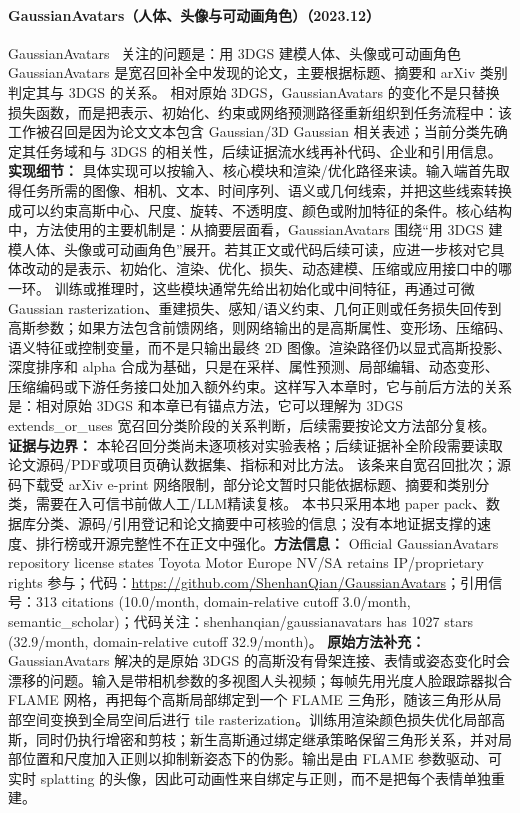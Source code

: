 \paragraph{GaussianAvatars（人体、头像与可动画角色）（2023.12）}
GaussianAvatars~\cite{2312_02069} 关注的问题是：用 3DGS 建模人体、头像或可动画角色 GaussianAvatars 是宽召回补全中发现的论文，主要根据标题、摘要和 arXiv 类别判定其与 3DGS 的关系。
相对原始 3DGS，GaussianAvatars 的变化不是只替换损失函数，而是把表示、初始化、约束或网络预测路径重新组织到任务流程中：该工作被召回是因为论文文本包含 Gaussian/3D Gaussian 相关表述；当前分类先确定其任务域和与 3DGS 的相关性，后续证据流水线再补代码、企业和引用信息。
\textbf{实现细节：} 具体实现可以按输入、核心模块和渲染/优化路径来读。输入端首先取得任务所需的图像、相机、文本、时间序列、语义或几何线索，并把这些线索转换成可以约束高斯中心、尺度、旋转、不透明度、颜色或附加特征的条件。核心结构中，方法使用的主要机制是：从摘要层面看，GaussianAvatars 围绕“用 3DGS 建模人体、头像或可动画角色”展开。若其正文或代码后续可读，应进一步核对它具体改动的是表示、初始化、渲染、优化、损失、动态建模、压缩或应用接口中的哪一环。 训练或推理时，这些模块通常先给出初始化或中间特征，再通过可微 Gaussian rasterization、重建损失、感知/语义约束、几何正则或任务损失回传到高斯参数；如果方法包含前馈网络，则网络输出的是高斯属性、变形场、压缩码、语义特征或控制变量，而不是只输出最终 2D 图像。渲染路径仍以显式高斯投影、深度排序和 alpha 合成为基础，只是在采样、属性预测、局部编辑、动态变形、压缩编码或下游任务接口处加入额外约束。这样写入本章时，它与前后方法的关系是：相对原始 3DGS 和本章已有锚点方法，它可以理解为 3DGS extends\_or\_uses 宽召回分类阶段的关系判断，后续需要按论文方法部分复核。
\textbf{证据与边界：} 本轮召回分类尚未逐项核对实验表格；后续证据补全阶段需要读取论文源码/PDF或项目页确认数据集、指标和对比方法。 该条来自宽召回批次；源码下载受 arXiv e-print 网络限制，部分论文暂时只能依据标题、摘要和类别分类，需要在入可信书前做人工/LLM精读复核。 本书只采用本地 paper pack、数据库分类、源码/引用登记和论文摘要中可核验的信息；没有本地证据支撑的速度、排行榜或开源完整性不在正文中强化。\textbf{方法信息：} Official GaussianAvatars repository license states Toyota Motor Europe NV/SA retains IP/proprietary rights 参与；代码：\url{https://github.com/ShenhanQian/GaussianAvatars}；引用信号：313 citations (10.0/month, domain-relative cutoff 3.0/month, semantic\_scholar)；代码关注：shenhanqian/gaussianavatars has 1027 stars (32.9/month, domain-relative cutoff 32.9/month)。
\textbf{原始方法补充：} GaussianAvatars 解决的是原始 3DGS 的高斯没有骨架连接、表情或姿态变化时会漂移的问题。输入是带相机参数的多视图人头视频；每帧先用光度人脸跟踪器拟合 FLAME 网格，再把每个高斯局部绑定到一个 FLAME 三角形，随该三角形从局部空间变换到全局空间后进行 tile rasterization。训练用渲染颜色损失优化局部高斯，同时仍执行增密和剪枝；新生高斯通过绑定继承策略保留三角形关系，并对局部位置和尺度加入正则以抑制新姿态下的伪影。输出是由 FLAME 参数驱动、可实时 splatting 的头像，因此可动画性来自绑定与正则，而不是把每个表情单独重建。

